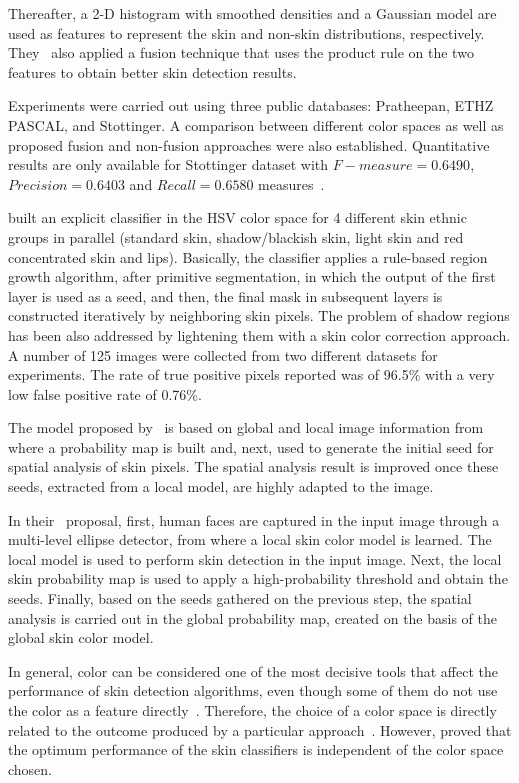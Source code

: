 Thereafter, a 2-D histogram with smoothed densities and a Gaussian model are used as features to represent the skin and non-skin distributions, respectively. They~\citep{tan:12} also applied a fusion technique that uses the product rule on the two features to obtain better skin detection results.

Experiments were carried out using three public databases: Pratheepan, ETHZ PASCAL, and Stottinger. A comparison between different color spaces as well as proposed fusion and non-fusion approaches were also established. Quantitative results are only available for Stottinger dataset with $F-measure = 0.6490$, $Precision = 0.6403$ and $Recall = 0.6580$ measures~\citep{tan:12}.

\citet{naji:12} built an explicit classifier in the HSV color space for 4 different skin ethnic groups in parallel (standard skin, shadow/blackish skin, light skin and red concentrated skin and lips). Basically, the classifier applies a rule-based region growth algorithm, after primitive segmentation, in which the output of the first layer is used as a seed, and then, the final mask in subsequent layers is constructed iteratively by neighboring skin pixels. The problem of shadow regions has been also addressed by lightening them with a skin color correction approach. A number of 125 images were collected from two different datasets for experiments. The rate of true positive pixels reported was of 96.5\% with a very low false positive rate of 0.76\%.

The model proposed by~\citet{kawulok:13} is based on global and local image information from where a probability map is built and, next, used to generate the initial seed for spatial analysis of skin pixels. The spatial analysis result is improved once these seeds, extracted from a local model, are highly adapted to the image.

In their~\citep{kawulok:13} proposal, first, human faces are captured in the input image through a multi-level ellipse detector, from where a local skin color model is learned. The local model is used to perform skin detection in the input image. Next, the local skin probability map is used to apply a high-probability threshold and obtain the seeds. Finally, based on the seeds gathered on the previous step, the spatial analysis is carried out in the global probability map, created on the basis of the global skin color model.

In general, color can be considered one of the most decisive tools that affect the performance of skin detection algorithms, even though some of them do not use the color as a feature directly~\citep{mahmoodi:16}. Therefore, the choice of a color space is directly related to the outcome produced by a particular approach~\citep{mahmoodi:16}. However, \citet{albiol:01} proved that the optimum performance of the skin classifiers is independent of the color space chosen.

